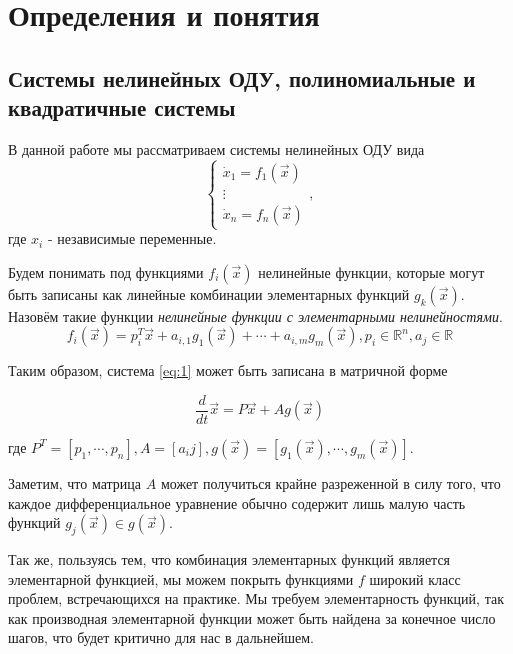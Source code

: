 
\section{Определения и понятия}

\subsection{Системы нелинейных ОДУ, полиномиальные и квадратичные системы}

В данной работе мы рассматриваем системы нелинейных ОДУ вида
\begin{equation} \label{eq:1}
    \begin{cases}
        \dot x_1 = f_1(\vec x)\\
        \vdots\\
        \dot x_n = f_n(\vec x)
    \end{cases},
\end{equation}
где $x_i$ - независимые переменные.

\begin{definition}
    Будем понимать под функциями $f_i(\vec x)$ нелинейные функции, которые могут быть записаны как линейные комбинации элементарных функций $g_k(\vec x)$. Назовём такие функции \textit{нелинейные функции с элементарными нелинейностями}.
    \begin{equation}
        f_i(\vec x) = p_i^T \vec x + a_{i,1} g_1(\vec x) + \cdots + a_{i,m} g_m(\vec x), p_i \in \mathbb{R}^n, a_j \in \mathbb{R}
    \end{equation}
\end{definition}



Таким образом, система \eqref{eq:1} может быть записана в матричной форме

\begin{equation}
    \frac{d}{dt} \vec x = P \vec x + Ag(\vec x)
\end{equation}

где $P^T = [p_1, \cdots, p_n], A = [a_ij], g(\vec x) = [g_1(\vec x), \cdots, g_m(\vec x)]$.

Заметим, что матрица $A$ может получиться крайне разреженной в силу того, что каждое дифференциальное уравнение обычно содержит лишь малую часть функций $g_j(\vec x) \in g(\vec x)$.

Так же, пользуясь тем, что комбинация элементарных функций является элементарной функцией, мы можем покрыть функциями $f$ широкий класс проблем, встречающихся на практике. Мы требуем элементарность функций, так как производная элементарной функции может быть найдена за конечное число шагов, что будет критично для нас в дальнейшем.


